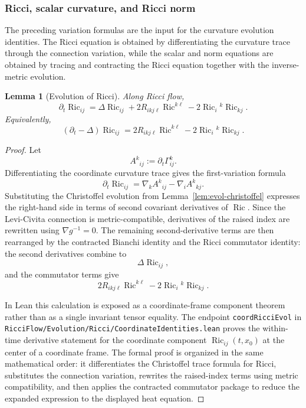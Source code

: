 \documentclass[11pt]{article}
\theoremstyle{plain}
\newtheorem{lemma}[theorem]{Lemma}
\theoremstyle{definition}
\theoremstyle{remark}
\newcommand{\Ric}{\operatorname{Ric}}
\newcommand{\leanref}[1]{\nolinkurl{#1}}
\newcommand{\leanfile}[1]{\nolinkurl{#1}}
\newcommand{\rffile}[1]{\leanfile{#1}}
\begin{document}
\subsubsection{Ricci, scalar curvature, and Ricci norm}

The preceding variation formulas are the input for the curvature evolution
identities.  The Ricci equation is obtained by differentiating the curvature
trace through the connection variation, while the scalar and norm equations are
obtained by tracing and contracting the Ricci equation together with the
inverse-metric evolution.

\begin{lemma}[Evolution of Ricci]
\label{lem:evol-ricci}
Along Ricci flow,
\[
\partial_t\Ric_{ij}
=
\Delta\Ric_{ij}
+2R_{ikj\ell}\Ric^{k\ell}
-2\Ric_i{}^k\Ric_{kj}.
\]
Equivalently,
\[
(\partial_t-\Delta)\Ric_{ij}
=
2R_{ikj\ell}\Ric^{k\ell}
-2\Ric_i{}^k\Ric_{kj}.
\]
\end{lemma}

\begin{proof}
Let
\[
  A^k{}_{ij}:=\partial_t\Gamma^k_{ij}.
\]
Differentiating the coordinate curvature trace gives the first-variation formula
\[
  \partial_t\Ric_{ij}
  =
  \nabla_k A^k{}_{ij}
  -
  \nabla_i A^k{}_{kj}.
\]
Substituting the Christoffel evolution from Lemma~\ref{lem:evol-christoffel}
expresses the right-hand side in terms of second covariant derivatives of
\(\Ric\).  Since the Levi-Civita connection is metric-compatible, derivatives of
the raised index are rewritten using \(\nabla g^{-1}=0\).  The remaining
second-derivative terms are then rearranged by the contracted Bianchi identity
and the Ricci commutator identity: the second derivatives combine to
\[
  \Delta\Ric_{ij},
\]
and the commutator terms give
\[
  2R_{ikj\ell}\Ric^{k\ell}
  -
  2\Ric_i{}^k\Ric_{kj}.
\]

In Lean this calculation is exposed as a coordinate-frame component theorem
rather than as a single invariant tensor equality.  The endpoint
\leanref{coordRicciEvol} in
\rffile{RicciFlow/Evolution/Ricci/CoordinateIdentities.lean} proves the
within-time derivative statement for the coordinate component
\(\Ric_{ij}(t,x_0)\) at the center of a coordinate frame.  The formal proof is
organized in the same mathematical order: it differentiates the Christoffel
trace formula for Ricci, substitutes the connection variation, rewrites the
raised-index terms using metric compatibility, and then applies the contracted
commutator package to reduce the expanded expression to the displayed heat
equation.
\end{proof}
\end{document}
